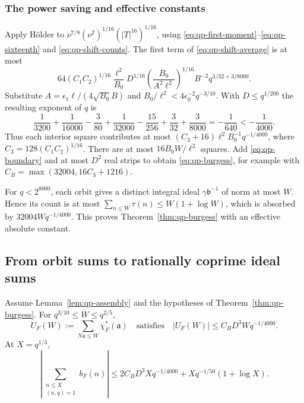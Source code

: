 \subsubsection{The power saving and effective constants}

Apply H\"older to
$\nu^{7/8}(\nu^2)^{1/16}(|T|^{16})^{1/16}$, using
\eqref{eq:qp-first-moment}--\eqref{eq:qp-sixteenth} and
\eqref{eq:qp-shift-counts}.  The first term of
\eqref{eq:qp-shift-average} is at most
\[
 64(C_1C_2)^{1/16}\frac{\ell^2}{B_0}
 D^{1/16}
 \left(\frac{B_0}{A^2\ell^2}\right)^{1/16}
 B^{-2}q^{3/32+3/8000}.
\]
Substitute $A=\epsilon_1\ell/(4\sqrt{B_0}B)$ and
$B_0/\ell^2<4\epsilon_0^{-2}q^{-3/10}$.
With $D\leq q^{1/200}$ the resulting exponent of $q$ is
\[
 \frac1{3200}+\frac1{16000}-\frac3{80}
 +\frac1{32000}-\frac{15}{256}+\frac3{32}+\frac3{8000}
 =-\frac1{640}<-\frac1{4000}.
\]
Thus each interior square contributes at most
$(C_3+16)\ell^2B_0^{-1}q^{-1/4000}$, where
$C_3=128(C_1C_2)^{1/16}$.  There are at most
$16B_0W/\ell^2$ squares.  Add \eqref{eq:qp-boundary} and at most
$D^2$ real strips to obtain \eqref{eq:qp-burgess}, for example with
$C_B=\max(32004,16C_3+1216)$.

For $q<2^{8000}$, each orbit gives a distinct integral ideal
$\gamma\mathfrak b^{-1}$ of norm at most $W$.  Hence its count is
at most $\sum_{n\leq W}\tau(n)\leq W(1+\log W)$, which is
absorbed by $32004Wq^{-1/4000}$.  This proves
Theorem~\ref{thm:qp-burgess} with an effective absolute constant.

\subsection{From orbit sums to rationally coprime ideal sums}

\begin{corollary}
\label{cor:qp-ideal-sum}
Assume Lemma~\ref{lem:qp-assembly} and the hypotheses of
Theorem~\ref{thm:qp-burgess}.  For $q^{3/10}\leq W\leq q^{2/5}$,
\[
 U_F(W):=\sum_{N\mathfrak a\leq W}\chi_F^*(\mathfrak a)
 \quad\text{satisfies}\quad
 |U_F(W)|\leq C_BD^3Wq^{-1/4000}.
\]
At $X=q^{1/3}$,
\begin{equation}
 \left|\sum_{\substack{n\leq X\\(n,q)=1}}b_F(n)\right|
 \leq 2C_BD^3Xq^{-1/4000}
       +Xq^{-1/50}(1+\log X).
 \label{eq:qp-coprime-sum}
\end{equation}
\end{corollary}

